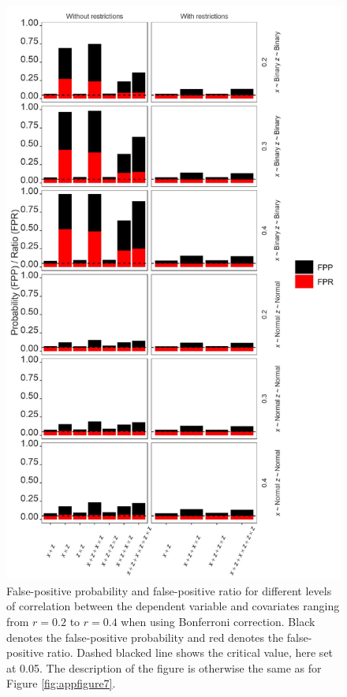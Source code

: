 \begin{landscape}
\begin{figure}[ht!]
\includegraphics[scale=0.65]{R/Analysis/Result/Figures/Figure2SIBon.jpeg}
\centering
\caption{False-positive probability and false-positive ratio for different levels of correlation between the dependent variable and covariates ranging from  $\textit{r}=0.2$ to  $\textit{r}=0.4$ when using Bonferroni correction. Black denotes the false-positive probability and red denotes the false-positive ratio. Dashed blacked line shows the critical value, here set at 0.05. The description of the figure is otherwise the same as for Figure \ref{fig:appfigure7}.}
\label{fig:appfigure8}
\end{figure}
\end{landscape}



